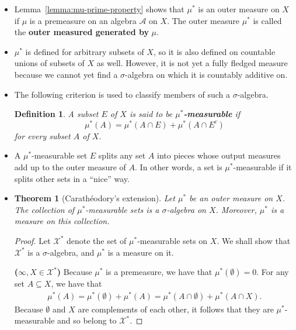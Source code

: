 \documentclass[10pt]{article}
\newtheorem{theorem}[lemma]{Theorem}
\newtheorem{definition}[lemma]{Definition}
\newcommand{\mcal}[1]{\mathcal{#1}}
\begin{document}
\begin{itemize}
  \item Lemma~\ref{lemma:mu-prime-property} shows that $\mu^*$ is an outer measure on $X$ if $\mu$ is a premeasure on an algebra $\mcal{A}$ on $X$. The outer measure $\mu^*$ is called the {\bf outer measured generated by} $\mu$.  
  
  \item $\mu^*$ is defined for arbitrary subsets of $X$, so it is also defined on countable unions of subsets of $X$ as well. However, it is not yet a fully fledged measure because we cannot yet find a $\sigma$-algebra on which it is countably additive on.
  
  \item The following criterion is used to classify members of such a $\sigma$-algebra.
  
  \begin{definition}
    A subset $E$ of $X$ is said to be {\bf $\mu^*$-measurable} if
    $$ \mu^*(A) = \mu^*(A \cap E) + \mu^*(A \cap E^c) $$
    for every subset $A$ of $X$.
  \end{definition}

  \item A $\mu^*$-measurable set $E$ splits any set $A$ into pieces whose output measures add up to the outer measure of $A$. In other words, a set is $\mu^*$-measurable if it splits other sets in a ``nice'' way.
  
  \item \begin{theorem}[Carath\'{e}odory's extension] Let $\mu^*$ be an outer measure on $X$. The collection of $\mu^*$-measurable sets is a $\sigma$-algebra on $X$. Moreover, $\mu^*$ is a measure on this collection.
  \end{theorem}

  \begin{proof} Let $\mcal{X}^*$ denote the set of $\mu^*$-measurable sets on $X$. We shall show that $\mcal{X}^*$ is a $\sigma$-algebra, and $\mu^*$ is a measure on it.

    {\bf ($\infty, X \in \mcal{X}^*$)} Because $\mu^*$ is a premeasure, we have that $\mu^*(\emptyset) = 0$. For any set $A \subseteq X$, we have that
    \begin{align*}
      \mu^*(A) = \mu^*(\emptyset) + \mu^*(A) = \mu^*(A \cap \emptyset) + \mu^*(A \cap X).
    \end{align*}
    Because $\emptyset$ and $X$ are complements of each other, it follows that they are $\mu^*$-measurable and so belong to $\mcal{X}^*$.


\end{proof}
\end{itemize}
\end{document}
